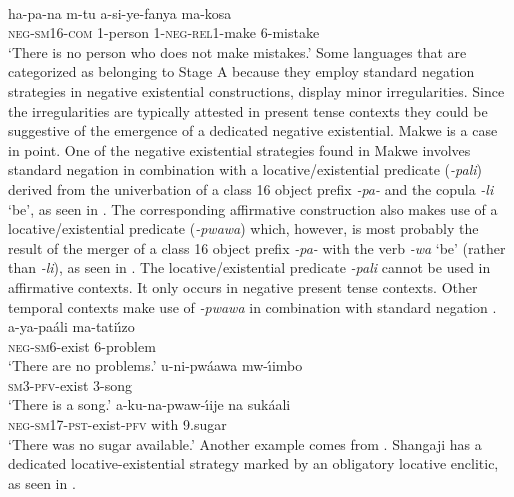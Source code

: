 \documentclass[output=paper]{langscibook}
\begin{document}
\ea\label{ex:swahili-mistake} \\ \gll ha-pa-na m-tu a-si-ye-fanya ma-kosa\\
\textsc{neg}-\textsc{sm}16-\textsc{com} 1-person
1-\textsc{neg}-\textsc{rel}1-make 6-mistake\\ \glt `There is no person who
does not make mistakes.' \z 
%
Some languages that are categorized as
belonging to Stage A because they employ standard negation strategies in
negative existential constructions, display minor irregularities. Since the
irregularities are typically attested in present tense contexts they could
be suggestive of the emergence of a dedicated negative existential.
Makwe is a case in point. One of the negative existential
strategies found in Makwe involves standard negation in combination with a
locative\slash existential predicate (\textit{-pali}) derived from the
univerbation of a class 16 object prefix \textit{-pa-} and the copula
\textit{-li} `be', as seen in .  The corresponding
affirmative construction also makes use of a locative\slash existential
predicate (\textit{-pwawa}) which, however, is most probably the result of
the merger of a class 16 object prefix \textit{-pa-} with the verb
\textit{-wa} `be' (rather than \textit{-li}), as seen in
.  The locative\slash existential predicate
\textit{-pali} cannot be used in affirmative contexts. It only occurs in
negative present tense contexts. Other temporal contexts make use of
\textit{-pwawa} in combination with standard negation .
%
\ea\label{ex:makwe-problem-song-sugar}  
\ea\label{ex:makwe-problem}
\gll a-ya-pa{\'a}li ma-tati{\'\i}zo\\ \textsc{neg-sm}6-exist 6-problem\\
\glt `There are no problems.' 
\ex\label{ex:makwe-song} \gll u-ni-pw{\'a}awa
mw-{\'\i}imbo\\ \textsc{sm3-pfv}{}-exist  3-song\\ \glt `There is a song.'
\ex\label{ex:makwe-sugar} \gll a-ku-na-pwaw-{\'\i}ije na suk{\'a}ali\\
\textsc{neg-sm17-pst}-exist-\textsc{pfv} with 9.sugar\\ \glt `There was no
sugar available.' \z\z 
%
Another example comes from . Shangaji
has a dedicated locative-ex\-is\-ten\-tial strategy marked by an obligatory
locative enclitic, as seen in . 
\end{document}
